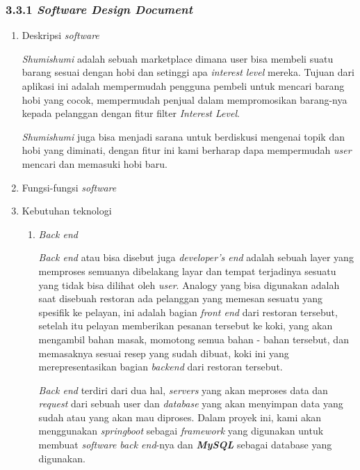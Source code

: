 \documentclass[a4paper]{article}
\begin{document}
\subsubsection*{3.3.1 \textit{Software Design Document}}
\begin{enumerate}[label=\alph*. ]
    \item Deskripsi \textit{software}
    
    \textit{Shumishumi} adalah sebuah marketplace dimana user bisa membeli suatu barang sesuai dengan hobi dan setinggi apa \textit{interest level} mereka. Tujuan dari aplikasi ini adalah mempermudah pengguna pembeli untuk mencari barang hobi yang cocok, mempermudah penjual dalam mempromosikan barang-nya kepada pelanggan dengan fitur filter \textit{Interest Level}. 


    \textit{Shumishumi} juga bisa menjadi sarana untuk berdiskusi mengenai topik dan hobi yang diminati, dengan fitur ini kami berharap dapa mempermudah \textit{user} mencari dan memasuki hobi baru.

    \item Fungsi-fungsi \textit{software}


    \item Kebutuhan teknologi

    \begin{enumerate}
        \item \textit{Back end} 

        \textit{Back end} atau bisa disebut juga \textit{developer's end} adalah sebuah layer yang memproses semuanya dibelakang layar dan tempat terjadinya sesuatu yang tidak bisa dilihat oleh \textit{user}\autocite{letsgodojo-frontend-backend}. Analogy yang bisa digunakan adalah saat disebuah restoran ada pelanggan yang memesan sesuatu yang spesifik ke pelayan, ini adalah bagian \textit{front end} dari restoran tersebut, setelah itu pelayan memberikan pesanan tersebut ke koki, yang akan mengambil bahan masak, momotong semua bahan - bahan tersebut, dan memasaknya sesuai resep yang sudah dibuat, koki ini yang merepresentasikan bagian \textit{backend} dari restoran tersebut\autocite{codecademy-backend}. 

        \textit{Back end} terdiri dari dua hal, \textit{servers} yang akan meproses data dan \textit{request} dari sebuah user dan \textit{database} yang akan menyimpan data yang sudah atau yang akan mau diproses\autocite{codecademy-backend}. Dalam proyek ini, kami akan menggunakan \textit{springboot} sebagai \textit{framework} yang digunakan untuk membuat \textit{software back end}-nya dan \textit{\textbf{MySQL}} sebagai database yang digunakan.


\end{enumerate}
\end{enumerate}
\end{document}
